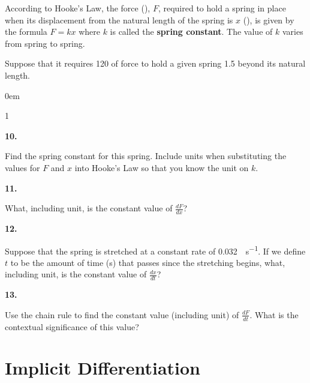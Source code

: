 \documentclass[12pt,]{book}
\newcommand{\terminology}[1]{\textbf{#1}}
\theoremstyle{plain}
\theoremstyle{definition}
\numberwithin{equation}{section}
\newenvironment{exercisegroup}%
{\medskip\noindent}%
{\par\bigskip}%
\newlength{\exercisegroupindent}%
\newlength{\exercisegroupitemwidth}%
\newenvironment{exercisegrouplist}%
{\vspace{-\partopsep}%
\begin{adjustwidth}{\exercisegroupindent}{0em}}%
{\end{adjustwidth}%
\vspace{-\partopsep}%
\vspace{\baselineskip}}%
\newenvironment{exercisegroupbycol}[1]%
{\begin{exercisegrouplist}%
\vspace{-\multicolsep}%
\begin{multicols}{#1}%
\setlength{\parindent}{0em}%
\setlength{\exercisegroupitemwidth}{\linewidth}}%
{\end{multicols}%
\vspace{-\multicolsep}%
\end{exercisegrouplist}}%
\newenvironment{exercisegroupitem}[1]%
{\begin{minipage}[t]{\exercisegroupitemwidth}
\vspace{0pt}%
{\bfseries#1}%
\rule{0pt}{\baselineskip}}{\strut%
\end{minipage}%
\hspace{\columnsep}}%
\providecommand\phantomsection{}
\newcommand{\lz}[2]{\frac{d#1}{d#2}}
\begin{document}
\begin{exercisegroup}%
According to Hooke's Law, the force (\si{\pound}), \(F\), required to hold a spring in place when its displacement from the natural length of the spring is \(x\) (\si{\foot}), is given by the formula \(F=kx\) where \(k\) is called the \terminology{spring constant}.  The value of \(k\) varies from spring to spring.%
\par
Suppose that it requires \SI{120}{\pound} of force to hold a given spring \SI{1.5}{\foot} beyond its natural length.%
\begin{exercisegroupbycol}{1}%
\begin{exercisegroupitem}{10. }\phantomsection\hypertarget{exercise-317}{\null}
Find the spring constant for this spring. Include units when substituting the values for \(F\) and \(x\) into Hooke's Law so that you know the unit on \(k\).%
\end{exercisegroupitem}%
\par%
\begin{exercisegroupitem}{11. }\phantomsection\hypertarget{exercise-318}{\null}
What, including unit, is the constant value of \(\lz{F}{x}\)?%
\end{exercisegroupitem}%
\par%
\begin{exercisegroupitem}{12. }\phantomsection\hypertarget{exercise-319}{\null}
Suppose that the spring is stretched at a constant rate of \SI{0.032}{\foot\per\second}.  If we define \(t\) to be the amount of time (\si{\second}) that passes since the stretching begins, what, including unit, is the constant value of \(\lz{x}{t}\)?%
\end{exercisegroupitem}%
\par%
\begin{exercisegroupitem}{13. }\phantomsection\hypertarget{exercise-320}{\null}
Use the chain rule to find the constant value (including unit) of \(\lz{F}{t}\).  What is the contextual significance of this value?%
\end{exercisegroupitem}%
\par%
\end{exercisegroupbycol}%
\end{exercisegroup}%
\typeout{************************************************}
\typeout{************************************************}
\chapter[Implicit Differentiation]{Implicit Differentiation}\label{chapter-implicit-differentiation}
\typeout{************************************************}
\typeout{************************************************}
\end{document}
